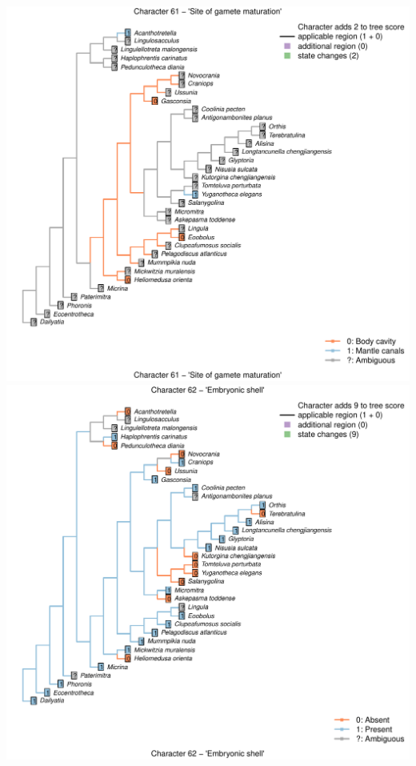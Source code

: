 \documentclass[]{book}
\theoremstyle{definition}
\theoremstyle{definition}
\theoremstyle{definition}
\theoremstyle{remark}
\begin{document}
\includegraphics{Brachiopod_phylogeny_files/figure-latex/unnamed-chunk-4-61.pdf}
\includegraphics{Brachiopod_phylogeny_files/figure-latex/unnamed-chunk-4-62.pdf}
\end{document}
